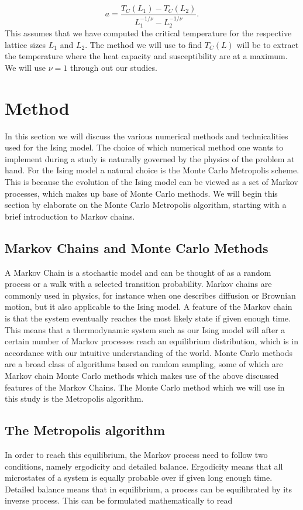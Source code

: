 \documentclass[a4paper, 10pt, reqno]{amsart}
\begin{document}
\begin{equation}\label{eq: a}
    a = \frac{T_C(L_1) - T_C(L_2)}{L_1^{-1/\nu} - L_2^{-1/\nu}}.
\end{equation}
This assumes that we have computed the critical temperature for the respective lattice sizes $L_1$ and $L_2$. The method we will use to find $T_C(L)$ will be to extract the temperature where the heat capacity and susceptibility are at a maximum. We will use $\nu = 1$ through out our studies.

\section{Method}
In this section we will discuss the various numerical methods and technicalities used for the Ising model. The choice of which numerical method one wants to implement during a study is naturally governed by the physics of the problem at hand. For the Ising model a natural choice is the Monte Carlo Metropolis scheme. This is because the evolution of the Ising model can be viewed as a set of Markov processes, which makes up base of Monte Carlo methods. We will begin this section by elaborate on the Monte Carlo Metropolis algorithm, starting with a brief introduction to Markov chains.

\subsection{Markov Chains and Monte Carlo Methods}
A Markov Chain is a stochastic model and can be thought of as a random process or a walk with a selected transition probability. Markov chains are commonly used in physics, for instance when one describes diffusion or Brownian motion, but it also applicable to the Ising model. A feature of the Markov chain is that the system eventually reaches the most likely state if given enough time. This means that a thermodynamic system such as our Ising model will after a certain number of Markov processes reach an equilibrium distribution, which is in accordance with our intuitive understanding of the world. Monte Carlo methods are a broad class of algorithms based on random sampling, some of which are Markov chain Monte Carlo methods which makes use of the above discussed features of the Markov Chains. The Monte Carlo method which we will use in this study is the Metropolis algorithm.

\subsection{The Metropolis algorithm}
In order to reach this equilibrium, the Markov process need to follow two conditions, namely ergodicity and detailed balance. Ergodicity means that all microstates of a system is equally probable over if given long enough time. Detailed balance means that in equilibrium, a process can be equilibrated by its inverse process. This can be formulated mathematically to read
\end{document}
